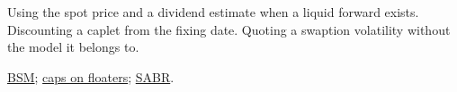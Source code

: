 \begin{qfmethod}
 Using the spot price and a dividend estimate when a liquid forward exists. Discounting a caplet from the fixing date. Quoting a swaption volatility without the model it belongs to.

 \hyperref[mod:black-scholes-merton]{BSM}; \hyperref[meth:capped-floored-floater-valuation]{caps on floaters}; \hyperref[mod:sabr-smile]{SABR}.

\end{qfmethod}
